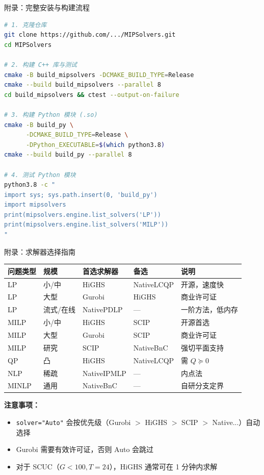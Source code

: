 \documentclass[10pt,aspectratio=169]{beamer}
\begin{document}
\begin{frame}[fragile]{附录：完整安装与构建流程}
  \begin{lstlisting}[language=bash]
# 1. 克隆仓库
git clone https://github.com/.../MIPSolvers.git
cd MIPSolvers

# 2. 构建 C++ 库与测试
cmake -B build_mipsolvers -DCMAKE_BUILD_TYPE=Release
cmake --build build_mipsolvers --parallel 8
cd build_mipsolvers && ctest --output-on-failure

# 3. 构建 Python 模块 (.so)
cmake -B build_py \
      -DCMAKE_BUILD_TYPE=Release \
      -DPython_EXECUTABLE=$(which python3.8)
cmake --build build_py --parallel 8

# 4. 测试 Python 模块
python3.8 -c "
import sys; sys.path.insert(0, 'build_py')
import mipsolvers
print(mipsolvers.engine.list_solvers('LP'))
print(mipsolvers.engine.list_solvers('MILP'))
"
  \end{lstlisting}
\end{frame}

\begin{frame}{附录：求解器选择指南}
  \footnotesize
  \begin{center}
  \begin{tabular}{@{}lllll@{}}
    \toprule
    \textbf{问题类型} & \textbf{规模} & \textbf{首选求解器} & \textbf{备选} & \textbf{说明} \\
    \midrule
    LP  & 小/中 & HiGHS & NativeLCQP  & 开源，速度快 \\
    LP  & 大型 & Gurobi & HiGHS       & 商业许可证 \\
    LP  & 流式/在线 & NativePDLP & ---  & 一阶方法，低内存 \\
    MILP & 小/中 & HiGHS & SCIP        & 开源首选 \\
    MILP & 大型 & Gurobi & SCIP        & 商业许可证 \\
    MILP & 研究 & SCIP   & NativeBnC   & 强切平面支持 \\
    QP  & 凸   & HiGHS  & NativeLCQP  & 需 $Q\succeq 0$ \\
    NLP & 稀疏 & NativeIPMLP & ---     & 内点法 \\
    MINLP & 通用 & NativeBnC & ---     & 自研分支定界 \\
    \bottomrule
  \end{tabular}
  \end{center}

  \vspace{8pt}
  \textbf{注意事项：}
  \begin{itemize}
    \item \texttt{solver="Auto"} 会按优先级（Gurobi $>$ HiGHS $>$ SCIP $>$ Native...）自动选择
    \item Gurobi 需要有效许可证，否则 Auto 会跳过
    \item 对于 SCUC（$G<100,T=24$），HiGHS 通常可在 1 分钟内求解
  \end{itemize}
\end{frame}
\end{document}
